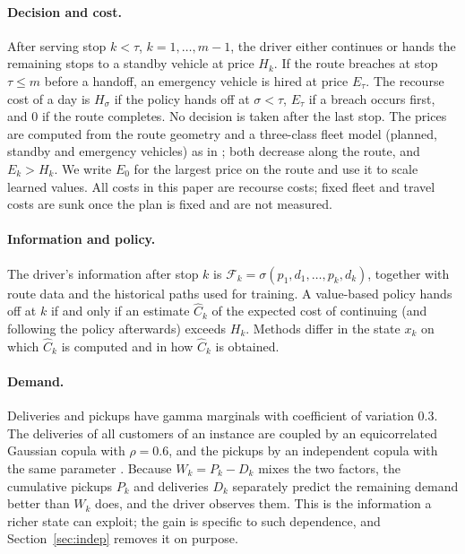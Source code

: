 \documentclass[trsc,dblanonrev]{informs4}
\begin{document}
\paragraph{Decision and cost.} After serving stop $k < \tau$,
$k = 1,\dots,m-1$, the driver either continues or hands the remaining stops to
a standby vehicle at price $H_k$. If the route breaches at stop $\tau \le m$
before a handoff, an emergency vehicle is hired at price $E_\tau$. The
recourse cost of a day is $H_\sigma$ if the policy hands off at $\sigma < \tau$,
$E_\tau$ if a breach occurs first, and $0$ if the route completes. No decision
is taken after the last stop. The prices are computed from the route geometry
and a three-class fleet model (planned, standby and emergency vehicles) as in
\citet{dang2026baton}; both decrease along the route, and $E_k > H_k$. We write
$E_0$ for the largest price on the route and use it to scale learned values.
All costs in this paper are recourse costs; fixed fleet and travel costs are
sunk once the plan is fixed and are not measured.

\paragraph{Information and policy.} The driver's information after stop $k$ is
$\mathcal F_k = \sigma(p_1, d_1, \dots, p_k, d_k)$, together with route data
and the historical paths used for training. A value-based policy hands off at
$k$ if and only if an estimate $\hat C_k$ of the expected cost of continuing
(and following the policy afterwards) exceeds $H_k$. Methods differ in the
state $x_k$ on which $\hat C_k$ is computed and in how $\hat C_k$ is obtained.

\paragraph{Demand.} Deliveries and pickups have gamma marginals with
coefficient of variation 0.3. The deliveries of all customers of an instance
are coupled by an equicorrelated Gaussian copula with $\rho = 0.6$, and the
pickups by an independent copula with the same parameter
\citep{dang2026baton}. Because $W_k = P_k - D_k$ mixes the two factors, the
cumulative pickups $P_k$ and deliveries $D_k$ separately predict the remaining
demand better than $W_k$ does, and the driver observes them. This is the
information a richer state can exploit; the gain is specific to such
dependence, and Section~\ref{sec:indep} removes it on purpose.

\end{document}
